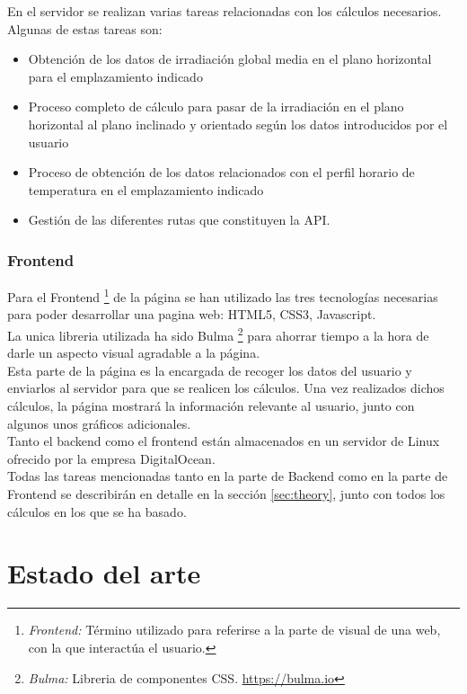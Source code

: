 \documentclass[11pt]{report}
\begin{document}
En el servidor se realizan varias tareas relacionadas con los cálculos necesarios. Algunas de estas tareas son:
\begin{itemize}
\item Obtención de los datos de irradiación global media en el plano horizontal para el emplazamiento indicado
\item Proceso completo de cálculo para pasar de la irradiación en el plano horizontal al plano inclinado y orientado según los datos introducidos por el usuario
\item Proceso de obtención de los datos relacionados con el perfil horario de temperatura en el emplazamiento indicado
\item Gestión de las diferentes rutas que constituyen la API.
\end{itemize}

\subsection{Frontend}
 Para el Frontend \footnote{\textit{Frontend:} Término utilizado para referirse a la parte de visual de una web, con la que interactúa el usuario.} de la página se han utilizado las tres tecnologías necesarias para poder desarrollar una pagina web: HTML5, CSS3, Javascript.\\
 
La unica libreria utilizada ha sido Bulma \footnote{\textit{Bulma:} Libreria de componentes CSS. \url{https://bulma.io}} para ahorrar tiempo a la hora de darle un aspecto visual agradable a la página.\\

Esta parte de la página es la encargada de recoger los datos del usuario  y enviarlos al servidor para que se realicen los cálculos. Una vez realizados dichos cálculos, la página mostrará la información relevante al usuario, junto con algunos unos gráficos adicionales.\\

Tanto el backend como el frontend están almacenados en un servidor de Linux ofrecido por la empresa DigitalOcean.\\

Todas las tareas mencionadas tanto en la parte de Backend como en la parte de Frontend se describirán en detalle en la sección \ref{sec:theory}, junto con todos los cálculos en los que se ha basado. 

\newpage

\chapter{Estado del arte}
\end{document}
